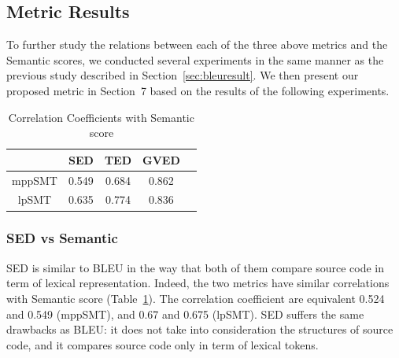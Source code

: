 \subsection{Metric Results}

To further study the relations between each of the three above metrics
and the Semantic scores, we conducted several experiments in the same
manner as the previous study described in
Section~\ref{sec:bleuresult}. We then present our proposed metric
in Section~7 based on the results of the following experiments.


\begin{table}
\caption{Correlation Coefficients with Semantic score}
\begin{tabular}{|c|c|c|c|c|}
\hline
 & SED & TED & GVED\\
\hline
mppSMT  & 0.549 & 0.684 & 0.862 \\
lpSMT  & 0.635 & 0.774 & 0.836 \\
\hline
\end{tabular}
\label{table:correlation}
\end{table}


\subsubsection{\textbf{SED vs Semantic}}

SED is similar to BLEU in the way that both of them compare source
code in term of lexical representation. Indeed, the two metrics have
similar correlations with Semantic score
(Table~\ref{table:correlation}). The correlation coefficient are
equivalent 0.524 and 0.549 (mppSMT), and 0.67 and 0.675 (lpSMT). SED
suffers the same drawbacks as BLEU: it does not take into
consideration the structures of source code, and it compares source
code only in term of lexical tokens. 

%

